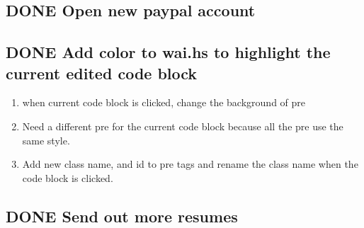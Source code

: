 \documentclass[11pt]{article}
\begin{document}
\subsection{{\bfseries\sffamily DONE} Open new paypal account}
\label{sec:org8b3a095}
\subsection{{\bfseries\sffamily DONE} Add color to wai.hs to highlight the current edited code block}
\label{sec:orgeb939ac}
\begin{enumerate}
\item when current code block is clicked, change the background of pre
\item Need a different pre for the current code block because all the pre use the same style.
\item Add new class name, and id to pre tags and rename the class name when the code block is clicked.
\end{enumerate}

\subsection{{\bfseries\sffamily DONE} Send out more resumes}
\label{sec:orga4e0562}
\end{document}
